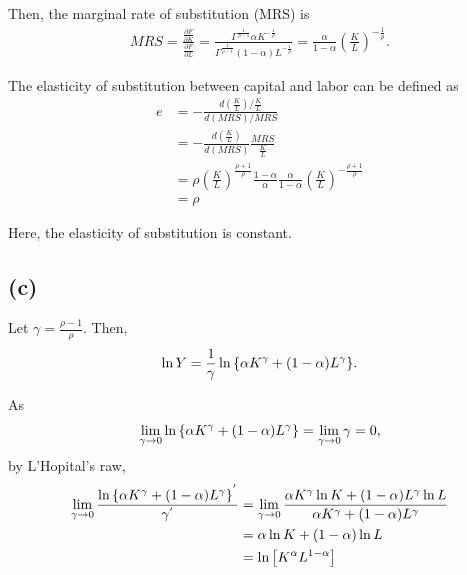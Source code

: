 \documentclass[a4paper]{article}
\begin{document}
Then, the marginal rate of substitution (MRS) is 
\begin{gather*}
    MRS = \frac{\frac{\partial F }{\partial K }}{\frac{\partial F }{\partial L }} = \frac{\Gamma^{\frac{1}{\rho-1}} \alpha K^{- \frac{1}{\rho}}}{\Gamma^{\frac{1}{\rho-1}} (1-\alpha) L^{- \frac{1}{\rho}}} = \frac{\alpha}{1-\alpha} \left( \frac{K}{L} \right)^{- \frac{1}{\rho}}.
\end{gather*}

The elasticity of substitution between capital and labor can be defined as
\begin{align*}
    e 
    &= - \frac{d (\frac{K}{L}) / \frac{K}{L}}{d (MRS)/ MRS}\\
    &= -\frac{d (\frac{K}{L})}{d (MRS)} \frac{MRS}{\frac{K}{L}}\\
    &= \rho \left(\frac{K}{L}\right)^{\frac{\rho+1}{\rho}} \frac{1-\alpha}{\alpha} \frac{\alpha}{1-\alpha} \left( \frac{K}{L}\right)^{- \frac{\rho+1}{\rho}}\\
    &= \rho
\end{align*}

Here, the elasticity of substitution is constant. 

\begin{comment}
\begin{align*}
\frac{\partial F(K,L)}{\partial K} &= \frac{1}{\rho-1} \Gamma \qty[ \frac{\rho-1}{\rho} \alpha K^{-\frac{1}{\rho}} ]\\
\frac{\partial F(K,L)}{\partial L} &= \frac{1}{\rho-1} \Gamma \qty[ \frac{\rho-1}{\rho} (1-\alpha) K^{-\frac{1}{\rho}} ]
\end{align*}

Thus elasticity $e$ is 
\begin{align*}
    e= \frac{\frac{\partial F(K,L)}{\partial K}}{\frac{\partial F(K,L)}{\partial L}} = \frac{1-\alpha}{\alpha} \qty(\frac{K}{L})^{\frac{1}{\rho}}
\end{align*}
\end{comment}




\subsection*{(c)}
Let $\gamma = \frac{\rho-1}{\rho}$. Then,
\begin{align*}
\ln Y = \frac{1}{\gamma} \ln\qty{\alpha K^{\gamma}+(1-\alpha)L^\gamma}.
\end{align*}

As 
\begin{align*}
    \lim_{\gamma\rightarrow 0} \ln\qty{\alpha K^{\gamma}+(1-\alpha)L^\gamma} = \lim_{\gamma\rightarrow 0} \gamma = 0,
\end{align*}
by L'Hopital's raw,
\begin{align*}
    \lim_{\gamma\rightarrow 0} \frac{\ln\qty{\alpha K^{\gamma}+(1-\alpha)L^\gamma}^{'}}{\gamma^{'}} &= \lim_{\gamma\rightarrow 0} \frac{\alpha K^\gamma \ln K + (1-\alpha)L^\gamma \ln L}{\alpha K^\gamma + (1-\alpha)L^\gamma }\\
    &= \alpha  \ln K + (1-\alpha) \ln L\\
    &= \ln \qty[K^\alpha L^{1-\alpha}]
\end{align*}
\end{document}
